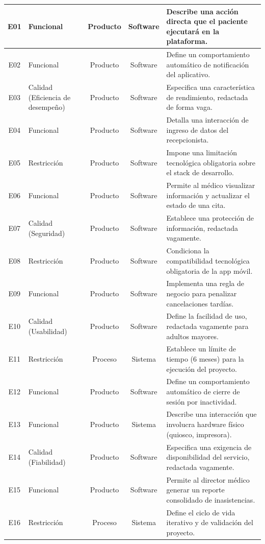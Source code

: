 \documentclass[12pt,a4paper]{article}
\begin{document}
\begin{longtable}{|c|p{3.5cm}|c|c|p{5cm}|}
E01 & Funcional & Producto & Software & Describe una acción directa que el paciente ejecutará en la plataforma. \\ \hline
E02 & Funcional & Producto & Software & Define un comportamiento automático de notificación del aplicativo. \\ \hline
E03 & Calidad (Eficiencia de desempeño) & Producto & Software & Especifica una característica de rendimiento, redactada de forma vaga. \\ \hline
E04 & Funcional & Producto & Software & Detalla una interacción de ingreso de datos del recepcionista. \\ \hline
E05 & Restricción & Producto & Software & Impone una limitación tecnológica obligatoria sobre el stack de desarrollo. \\ \hline
E06 & Funcional & Producto & Software & Permite al médico visualizar información y actualizar el estado de una cita. \\ \hline
E07 & Calidad (Seguridad) & Producto & Software & Establece una protección de información, redactada vagamente. \\ \hline
E08 & Restricción & Producto & Software & Condiciona la compatibilidad tecnológica obligatoria de la app móvil. \\ \hline
E09 & Funcional & Producto & Software & Implementa una regla de negocio para penalizar cancelaciones tardías. \\ \hline
E10 & Calidad (Usabilidad) & Producto & Software & Define la facilidad de uso, redactada vagamente para adultos mayores. \\ \hline
E11 & Restricción & Proceso & Sistema & Establece un límite de tiempo (6 meses) para la ejecución del proyecto. \\ \hline
E12 & Funcional & Producto & Software & Define un comportamiento automático de cierre de sesión por inactividad. \\ \hline
E13 & Funcional & Producto & Sistema & Describe una interacción que involucra hardware físico (quiosco, impresora). \\ \hline
E14 & Calidad (Fiabilidad) & Producto & Software & Especifica una exigencia de disponibilidad del servicio, redactada vagamente. \\ \hline
E15 & Funcional & Producto & Software & Permite al director médico generar un reporte consolidado de inasistencias. \\ \hline
E16 & Restricción & Proceso & Sistema & Define el ciclo de vida iterativo y de validación del proyecto. \\ \hline

\end{longtable}
\end{document}
